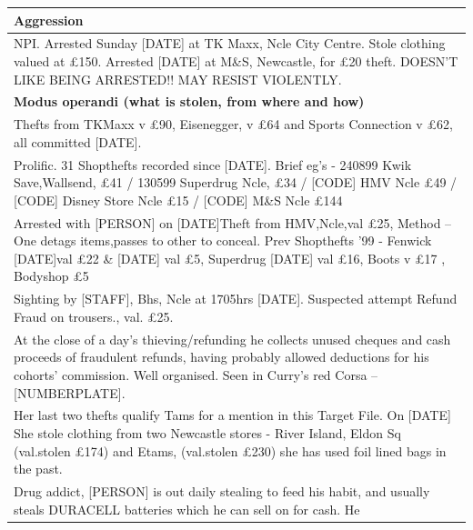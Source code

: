 \documentclass{llncs}
\begin{document}

\begin{table}[!ht]
\centering
\begin{tabularx}{\textwidth}{|X|}
\hline
{\textbf{Aggression}} \\
\hline
NPI. Arrested Sunday [DATE] at TK Maxx, Ncle City Centre. Stole
clothing valued at \pounds 150.  Arrested [DATE] at M\&S, Newcastle,
for \pounds 20 theft.   DOESN'T LIKE BEING ARRESTED!!  MAY RESIST
VIOLENTLY. \\
\hline
{\textbf{Modus operandi (what is stolen, from where and how)}} \\
\hline
Thefts from TKMaxx v \pounds 90,  Eisenegger, v \pounds 64 and Sports
Connection v \pounds 62, all committed [DATE]. \\
\hline
Prolific. 31 Shopthefts recorded since [DATE].  Brief eg's - 240899
Kwik Save,Wallsend, \pounds 41 / 130599 Superdrug Ncle, \pounds 34 /
[CODE] HMV Ncle \pounds 49 / [CODE] Disney Store Ncle \pounds 15 /
[CODE] M\&S Ncle \pounds 144 \\
\hline
Arrested with [PERSON] on [DATE]Theft from HMV,Ncle,val \pounds 25,
Method -- One detags items,passes to other to conceal. Prev Shopthefts
'99 -  Fenwick [DATE]val \pounds 22 \& [DATE] val \pounds 5, Superdrug
[DATE] val \pounds 16, Boots v \pounds 17 , Bodyshop \pounds 5 \\
\hline
Sighting by [STAFF], Bhs, Ncle at 1705hrs [DATE]. Suspected attempt
Refund Fraud on trousers., val. \pounds 25. \\
\hline
At the close of a day's thieving/refunding he collects unused cheques
and cash proceeds of fraudulent refunds, having probably allowed
deductions for his cohorts' commission.  Well organised. Seen in
Curry's red Corsa – [NUMBERPLATE]. \\
\hline
Her last two thefts qualify Tams for a mention in this Target File. On
[DATE] She stole clothing from two Newcastle stores - River Island,
Eldon Sq (val.stolen \pounds 174) and Etams, (val.stolen \pounds 230)
she has used foil lined bags in the past. \\
\hline
Drug addict, [PERSON] is out daily stealing to feed his habit, and
usually steals DURACELL batteries which he can sell on for cash. He

\end{tabularx}
\end{table}
\end{document}
